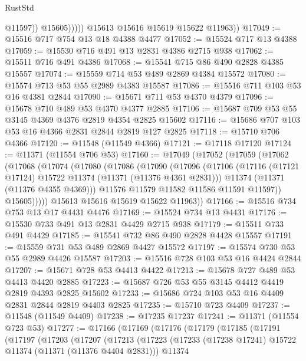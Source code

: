 \begin{lexlean}{RustStd}
\begin{coremodule}
                      @11597))
                  @15605)))))
        @15613
        @15616
        @15619
        @15622
        @11963))
@17049 := @15516 @717 @754 @13 @18 @4388 @4477
@17052 := @15524 @717 @13 @4388
@17059 := @15530 @716 @491 @13 @2831 @4386 @2715 @938
@17062 := @15511 @716 @491 @4386
@17068 := @15541 @715 @86 @490 @2828 @4385 @15557
@17074 := @15559 @714 @53 @489 @2869 @4384 @15572
@17080 := @15574 @713 @53 @55 @2989 @4383 @15587
@17086 := @15516 @711 @103 @53 @16 @4381 @2844
@17090 := @15671 @711 @53 @4370 @4379
@17096 := @15678 @710 @489 @53 @4370 @4377 @2885
@17106 := @15687 @709 @53 @55 @3145 @4369 @4376 @2819 @4354 @2825 @15602
@17116 := @15686 @707 @103 @53 @16 @4366 @2831 @2844 @2819 @127 @2825
@17118 := @15710 @706 @4366
@17120 := @11548 (@11549 @4366)
@17121 := @17118 @17120
@17124 := @11371 (@11554 @706 @53)
@17160 := @17049
    (@17052
      (@17059
        (@17062
          (@17068
            (@17074
              (@17080
                (@17086
                  (@17090
                    (@17096
                      (@17106
                        (@17116 (@17121 @17124) @15722 @11374 (@11371 (@11376 @4361 @2831)))
                        @11374
                        (@11371 (@11376 @4355 @4369)))
                      @11576
                      @11579
                      @11582
                      @11586
                      @11591
                      @11597))
                  @15605)))))
        @15613
        @15616
        @15619
        @15622
        @11963))
@17166 := @15516 @734 @753 @13 @17 @4431 @4476
@17169 := @15524 @734 @13 @4431
@17176 := @15530 @733 @491 @13 @2831 @4429 @2715 @938
@17179 := @15511 @733 @491 @4429
@17185 := @15541 @732 @86 @490 @2828 @4428 @15557
@17191 := @15559 @731 @53 @489 @2869 @4427 @15572
@17197 := @15574 @730 @53 @55 @2989 @4426 @15587
@17203 := @15516 @728 @103 @53 @16 @4424 @2844
@17207 := @15671 @728 @53 @4413 @4422
@17213 := @15678 @727 @489 @53 @4413 @4420 @2885
@17223 := @15687 @726 @53 @55 @3145 @4412 @4419 @2819 @4393 @2825 @15602
@17233 := @15686 @724 @103 @53 @16 @4409 @2831 @2844 @2819 @4403 @2825
@17235 := @15710 @723 @4409
@17237 := @11548 (@11549 @4409)
@17238 := @17235 @17237
@17241 := @11371 (@11554 @723 @53)
@17277 := @17166
    (@17169
      (@17176
        (@17179
          (@17185
            (@17191
              (@17197
                (@17203
                  (@17207
                    (@17213
                      (@17223
                        (@17233 (@17238 @17241) @15722 @11374 (@11371 (@11376 @4404 @2831)))
                        @11374

\end{coremodule}
\end{lexlean}
